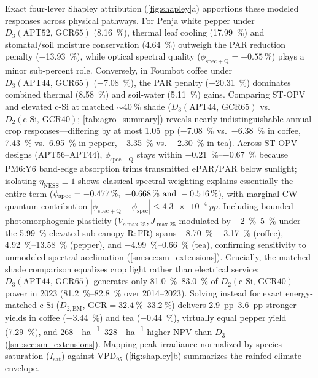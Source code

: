 \documentclass[preprint,12pt,a4paper]{elsarticle}
\begin{document}
Exact four-lever Shapley attribution (\cref{fig:shapley}a) apportions these modeled responses across physical pathways. For Penja white pepper under $D_3(\mathrm{APT52,\,GCR65})$ (\qty{+8.16}{\percent}), thermal leaf cooling (\qty{+17.99}{\percent}) and stomatal/soil moisture conservation (\qty{+4.64}{\percent}) outweigh the PAR reduction penalty (\qty{-13.93}{\percent}), while optical spectral quality ($\phi_{\mathrm{spec+Q}} = \qty{-0.55}{\percent}$) plays a minor sub-percent role. Conversely, in Foumbot coffee under $D_3(\mathrm{APT44,\,GCR65})$ (\qty{-7.08}{\percent}), the PAR penalty (\qty{-20.31}{\percent}) dominates combined thermal (\qty{+8.58}{\percent}) and soil-water (\qty{+5.11}{\percent}) gains. Comparing ST-OPV and elevated c-Si at matched $\sim\qty{40}{\percent}$ shade ($D_3(\mathrm{APT44,\,GCR65})$ vs.\ $D_2(\mathrm{c\text{-}Si,\,GCR40})$; \cref{tab:agro_summary}) reveals nearly indistinguishable annual crop responses---differing by at most \qty{1.05}{pp} (\qty{-7.08}{\percent} vs.\ \qty{-6.38}{\percent} in coffee, \qty{+7.43}{\percent} vs.\ \qty{+6.95}{\percent} in pepper, \qty{-3.35}{\percent} vs.\ \qty{-2.30}{\percent} in tea). Across ST-OPV designs ($\mathrm{APT56}$--$\mathrm{APT44}$), $\phi_{\mathrm{spec+Q}}$ stays within \qtyrange{-0.21}{-0.67}{\percent} because PM6:Y6 band-edge absorption trims transmitted $\mathrm{ePAR}/\mathrm{PAR}$ below sunlight; isolating $\eta_{\mathrm{NESS}}\equiv 1$ shows classical spectral weighting explains essentially the entire term ($\phi_{\mathrm{spec}} = \qtylist{-0.477;-0.668;-0.516}{\percent}$), with marginal CW quantum contribution $|\phi_{\mathrm{spec+Q}}-\phi_{\mathrm{spec}}| \le \qty{4.3e-4}{pp}$. Including bounded photomorphogenic plasticity ($V_{c\max 25}, J_{\max 25}$ modulated by \qtyrange{-2}{+5}{\percent} under the \qty{+5.99}{\percent} elevated sub-canopy $\mathrm{R{:}FR}$) spans \qtyrange{-8.70}{-3.17}{\percent} (coffee), \qtyrange{+4.92}{+13.58}{\percent} (pepper), and \qtyrange{-4.99}{+0.66}{\percent} (tea), confirming sensitivity to unmodeled spectral acclimation (\cref{sm:sec:sm_extensions}). Crucially, the matched-shade comparison equalizes crop light rather than electrical service: $D_3(\mathrm{APT44,\,GCR65})$ generates only \qtyrange{81.0}{83.0}{\percent} of $D_2(\mathrm{c\text{-}Si,\,GCR40})$ power in 2023 (\qtyrange{81.2}{82.8}{\percent} over 2014--2023). Solving instead for exact energy-matched c-Si ($D_{2,\mathrm{EM}}$, $\mathrm{GCR}=\qtyrange{32.4}{33.2}{\percent}$) delivers \qtyrange{2.9}{3.6}{pp} stronger yields in coffee (\qty{-3.44}{\percent}) and tea (\qty{-0.44}{\percent}), virtually equal pepper yield (\qty{+7.29}{\percent}), and \qtyrange{268}{328}{\kUSD\per\hectare} higher NPV than $D_3$ (\cref{sm:sec:sm_extensions}). Mapping peak irradiance normalized by species saturation ($I_{\mathrm{sat}}$) against $\mathrm{VPD}_{95}$ (\cref{fig:shapley}b) summarizes the rainfed climate envelope.
\end{document}
